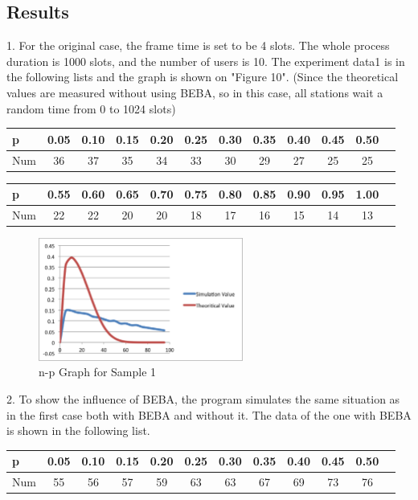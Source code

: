 \documentclass[11pt,a4paper]{report}
\begin{document}
\subsection*{Results}
1. For the original case, the frame time is set to be 4 slots. The whole process duration is 1000 slots, and the number of users is 10. The experiment data1 is in the following lists and the graph is shown on "Figure 10". (Since the theoretical values are measured without using BEBA, so in this case, all stations wait a random time from 0 to 1024 slots) \\
\begin{table}[htbp]
\begin{tabular}{lccccccccccc}
\toprule
p & 0.05 & 0.10 & 0.15  & 0.20 & 0.25 & 0.30 & 0.35 & 0.40 & 0.45 & 0.50 \\
\midrule
Num & 36 & 37 & 35 & 34 & 33 & 30 & 29 & 27 & 25 & 25 \\
\bottomrule
\end{tabular}
\end{table}

\begin{table}[htbp]
\begin{tabular}{lccccccccccc}
\toprule
p & 0.55 & 0.60 & 0.65  & 0.70 & 0.75 & 0.80 & 0.85 & 0.90 & 0.95 & 1.00 \\
\midrule
Num & 22 & 22 & 20 & 20 & 18 & 17 & 16 & 15 & 14 & 13 \\
\bottomrule
\end{tabular}
\end{table}

\begin{figure}
\centering
\includegraphics[width=0.6\textwidth]{4_2.eps}
\caption{n-p Graph for Sample 1}
\end{figure}

2. To show the influence of BEBA, the program simulates the same situation as in the first case both with BEBA and without it. The data of the one with BEBA is shown in the following list. \\
\begin{table}[htbp]
\begin{tabular}{lccccccccccc}
\toprule
p & 0.05 & 0.10 & 0.15  & 0.20 & 0.25 & 0.30 & 0.35 & 0.40 & 0.45 & 0.50 \\
\midrule
Num & 55 & 56 & 57 & 59 & 63 & 63 & 67 & 69 & 73 & 76 \\
\bottomrule
\end{tabular}
\end{table}
\end{document}
